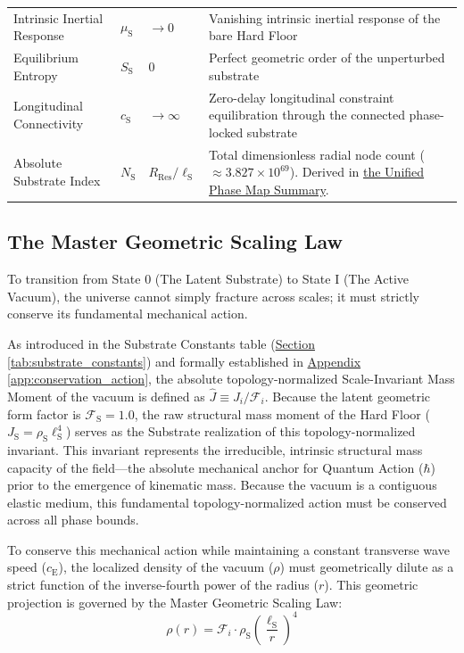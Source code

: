 \begin{table}[H]
\begin{tabular}{@{}ll l p{6.5cm}@{}}
Intrinsic Inertial Response
& $\mu_{\mathrm{S}}$
& $\to0$
& Vanishing intrinsic inertial response of the bare Hard Floor \\

Equilibrium Entropy
& $S_{\mathrm{S}}$
& $0$
& Perfect geometric order of the unperturbed substrate \\

Longitudinal Connectivity
& $c_{\mathrm{S}}$
& $\to\infty$
& Zero-delay longitudinal constraint equilibration through the connected phase-locked substrate \\

Absolute Substrate Index
& $N_{\mathrm{S}}$
& $R_{\mathrm{Res}}/\ell_{\mathrm{S}}$
& Total dimensionless radial node count ($\approx 3.827\times10^{69}$). Derived in \hyperref[sec:unified_phase_summary]{the Unified Phase Map Summary}. \\

\bottomrule
\end{tabular}
\end{table}

\subsection*{The Master Geometric Scaling Law}
To transition from State 0 (The Latent Substrate) to State I (The Active Vacuum), the universe cannot simply fracture across scales; it must strictly conserve its fundamental mechanical action.

As introduced in the Substrate Constants table (\hyperref[tab:substrate_constants]{Section \ref*{tab:substrate_constants}}) and formally established in \hyperref[app:conservation_action]{Appendix \ref*{app:conservation_action}}, the absolute topology-normalized Scale-Invariant Mass Moment of the vacuum is defined as $\hat{J} \equiv J_i / \mathcal{F}_i$. Because the latent geometric form factor is $\mathcal{F}_{\mathrm{S}} = 1.0$, the raw structural mass moment of the Hard Floor ($J_{\mathrm{S}} = \rho_{\mathrm{S}} \ell_{\mathrm{S}}^4$) serves as the Substrate realization of this topology-normalized invariant. This invariant represents the irreducible, intrinsic structural mass capacity of the field---the absolute mechanical anchor for Quantum Action ($\hbar$) prior to the emergence of kinematic mass. Because the vacuum is a contiguous elastic medium, this fundamental topology-normalized action must be conserved across all phase bounds.

To conserve this mechanical action while maintaining a constant transverse wave speed ($c_{\mathrm{E}}$), the localized density of the vacuum ($\rho$) must geometrically dilute as a strict function of the inverse-fourth power of the radius ($r$). This geometric projection is governed by the Master Geometric Scaling Law:
\begin{equation}
    \rho(r) = \mathcal{F}_i \cdot \rho_{\mathrm{S}} \left(\frac{\ell_{\mathrm{S}}}{r}\right)^4
\end{equation}

